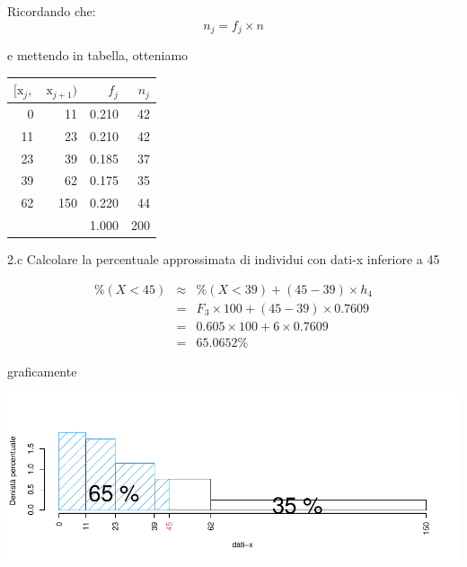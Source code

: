 \documentclass[
  11pt,
]{book}
\theoremstyle{mytheoremstyle}
\theoremstyle{mydefstyle}
\newenvironment{sol}
  {
  \begin{tcolorbox}[enhanced,breakable,arc=0.1mm,boxrule=1pt,colback=white,colframe=iblue,
  title=\bf \fontfamily{lmss}\selectfont \hspace{.5 cm} Soluzione,drop fuzzy shadow]

}{
\end{tcolorbox}
  }
\begin{document}
\begin{sol}

Ricordando che:
\[
n_j=f_j\times n
\]

e mettendo in tabella, otteniamo

\begin{table}[H]
\centering
\begin{tabular}{rrrr}
\toprule
$[\text{x}_j,$ & $\text{x}_{j+1})$ & $f_j$ & $n_j$\\
\midrule
0 & 11 & 0.210 & 42\\
11 & 23 & 0.210 & 42\\
23 & 39 & 0.185 & 37\\
39 & 62 & 0.175 & 35\\
62 & 150 & 0.220 & 44\\
 &  & 1.000 & 200\\
\bottomrule
\end{tabular}
\end{table}

\end{sol}

2.c Calcolare la percentuale approssimata di individui con dati-x inferiore a 45

\begin{sol}

\begin{eqnarray*}
\%(X<45)   &\approx&  \%(X<39)+(45-39)\times h_4\\
&=& F_3\times 100+(45-39)\times 0.7609\\
&=& 0.605\times 100 + 6\times 0.7609\\
&=& 65.0652\%
\end{eqnarray*}

graficamente

\begin{center}\includegraphics{Esami_passati_con_soluzioni_files/figure-latex/01-descr-12-1} \end{center}

\end{sol}
\end{document}
